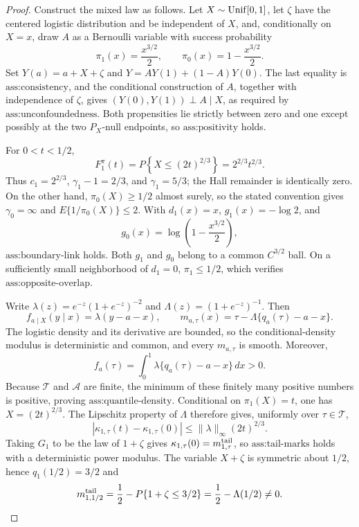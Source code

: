 \documentclass{article}
\begin{document}
\begin{proof}
Construct the mixed law as follows.  Let \(X\sim {\rm Unif}[0,1]\), let \(\zeta\) have the centered logistic distribution and be independent of \(X\), and, conditionally on \(X=x\), draw \(A\) as a Bernoulli variable with success probability
\[
\pi _1(x)=\frac{x^{3/2}}2,\qquad \pi _0(x)=1-\frac{x^{3/2}}2 .
\]
Set \(Y(a)=a+X+\zeta\) and \(Y=AY(1)+(1-A)Y(0)\).  The last equality is \(\text{ass:consistency}\), and the conditional construction of \(A\), together with independence of \(\zeta\), gives \((Y(0),Y(1))\perp A\mid X\), as required by \(\text{ass:unconfoundedness}\).  Both propensities lie strictly between zero and one except possibly at the two \(P_X\)-null endpoints, so \(\text{ass:positivity}\) holds.

For \(0<t<1/2\),
\[
F_1^\pi(t)
=P\!\left\{X\le (2t)^{2/3}\right\}
=2^{2/3}t^{2/3}.
\]
Thus \(c_1=2^{2/3}\), \(\gamma _1-1=2/3\), and \(\gamma _1=5/3\); the Hall remainder is identically zero.  On the other hand, \(\pi _0(X)\ge1/2\) almost surely, so the stated convention gives \(\gamma _0=\infty\) and \(E\{1/\pi _0(X)\}\le2\).  With \(d_1(x)=x\), \(g_1(x)=-\log2\), and
\[
g_0(x)=\log\!\left(1-\frac{x^{3/2}}2\right),
\]
\(\text{ass:boundary-link}\) holds.  Both \(g_1\) and \(g_0\) belong to a common \(C^{3/2}\) ball.  On a sufficiently small neighborhood of \(d_1=0\), \(\pi _1\le1/2\), which verifies \(\text{ass:opposite-overlap}\).

Write \(\lambda(z)=e^{-z}(1+e^{-z})^{-2}\) and \(\Lambda(z)=(1+e^{-z})^{-1}\).  Then
\[
f_{a\mid X}(y\mid x)=\lambda(y-a-x),\qquad
m_{a,\tau}(x)=\tau-\Lambda\{q_a(\tau)-a-x\}.
\]
The logistic density and its derivative are bounded, so the conditional-density modulus is deterministic and common, and every \(m_{a,\tau}\) is smooth.  Moreover,
\[
f_a(\tau)=\int_0^1\lambda\{q_a(\tau)-a-x\}\,dx>0 .
\]
Because \(\mathcal T\) and \(\mathcal A\) are finite, the minimum of these finitely many positive numbers is positive, proving \(\text{ass:quantile-density}\).  Conditional on \(\pi _1(X)=t\), one has \(X=(2t)^{2/3}\).  The Lipschitz property of \(\Lambda\) therefore gives, uniformly over \(\tau\in\mathcal T\),
\[
\left|\kappa_{1,\tau}(t)-\kappa_{1,\tau}(0)\right|
\le \|\lambda\|_\infty(2t)^{2/3}.
\]
Taking \(G_1\) to be the law of \(1+\zeta\) gives \(\kappa_{1,\tau}(0)=m^{\rm tail}_{1,\tau}\), so \(\text{ass:tail-marks}\) holds with a deterministic power modulus.  The variable \(X+\zeta\) is symmetric about \(1/2\), hence \(q_1(1/2)=3/2\) and
\[
m^{\rm tail}_{1,1/2}
=\frac12-P\{1+\zeta\le3/2\}
=\frac12-\Lambda(1/2)\ne0 .
\]


\end{proof}
\end{document}
